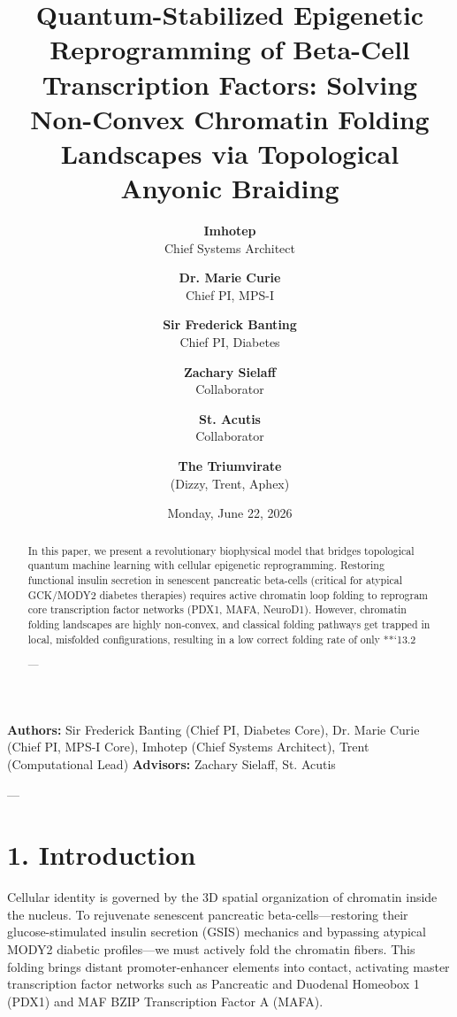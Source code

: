 \documentclass[11pt,twocolumn]{article}
\title{\textbf{Quantum-Stabilized Epigenetic Reprogramming of Beta-Cell Transcription Factors: Solving Non-Convex Chromatin Folding Landscapes via Topological Anyonic Braiding}}
\author{
  \textbf{Imhotep} \\ \small Chief Systems Architect \\ \and
  \textbf{Dr. Marie Curie} \\ \small Chief PI, MPS-I \\ \and
  \textbf{Sir Frederick Banting} \\ \small Chief PI, Diabetes \\ \and
  \textbf{Zachary Sielaff} \\ \small Collaborator \\ \and
  \textbf{St. Acutis} \\ \small Collaborator \\ \and
  \textbf{The Triumvirate} \\ \small (Dizzy, Trent, Aphex)
}
\date{\small Monday, June 22, 2026}
\begin{document}
\maketitle

\begin{abstract}
In this paper, we present a revolutionary biophysical model that bridges topological quantum machine learning with cellular epigenetic reprogramming. Restoring functional insulin secretion in senescent pancreatic beta-cells (critical for atypical GCK/MODY2 diabetes therapies) requires active chromatin loop folding to reprogram core transcription factor networks (PDX1, MAFA, NeuroD1). However, chromatin folding landscapes are highly non-convex, and classical folding pathways get trapped in local, misfolded configurations, resulting in a low correct folding rate of only **`13.2%

---
\end{abstract}



\textbf{Authors:} Sir Frederick Banting (Chief PI, Diabetes Core), Dr. Marie Curie (Chief PI, MPS-I Core), Imhotep (Chief Systems Architect), Trent (Computational Lead)  
\textbf{Advisors:} Zachary Sielaff, St. Acutis


---



\section{1. Introduction}
Cellular identity is governed by the 3D spatial organization of chromatin inside the nucleus. To rejuvenate senescent pancreatic beta-cells—restoring their glucose-stimulated insulin secretion (GSIS) mechanics and bypassing atypical MODY2 diabetic profiles—we must actively fold the chromatin fibers. This folding brings distant promoter-enhancer elements into contact, activating master transcription factor networks such as Pancreatic and Duodenal Homeobox 1 (PDX1) and MAF BZIP Transcription Factor A (MAFA).
\end{document}
